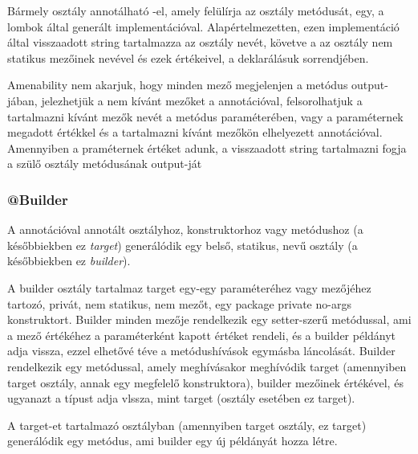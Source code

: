 Bármely osztály annotálható -el, amely felülírja az osztály  metódusát, egy, a lombok által generált implementációval. Alapértelmezetten, ezen implementáció által visszaadott string tartalmazza az osztály nevét, követve a az osztály nem statikus mezőinek nevével és ezek értékeivel, a deklarálásuk sorrendjében. \par

 Amenability nem akarjuk, hogy minden mező megjelenjen a metódus output-jában, jelezhetjük a nem kívánt mezőket a  annotációval, felsorolhatjuk a tartalmazni kívánt mezők nevét a  metódus  paraméterében, vagy a  paraméternek megadott  értékkel és a tartalmazni kívánt mezőkön elhelyezett  annotációval. Amennyiben a  praméternek  értéket adunk, a visszaadott string tartalmazni fogja a szülő osztály  metódusának output-ját \par

\subsubsection{@Builder}

A  annotációval annotált  osztályhoz, konstruktorhoz vagy metódushoz (a későbbiekben ez \emph{target}) generálódik egy belső, statikus,  nevű osztály (a későbbiekben ez \emph{builder}). \par

A builder osztály tartalmaz target egy-egy paraméteréhez vagy mezőjéhez tartozó, privát, nem statikus, nem  mezőt, egy package private no-args konstruktort. Builder minden mezője rendelkezik egy setter-szerű metódussal, ami a mező értékéhez a paraméterként kapott értéket rendeli, és a builder példányt adja vissza, ezzel elhetővé téve a metódushívások egymásba láncolását. Builder rendelkezik egy  metódussal, amely meghívásakor meghívódik target (amennyiben target osztály, annak egy megfelelő konstruktora), builder mezőinek értékével, és ugyanazt a típust adja vlssza, mint target (osztály esetében ez target). \par

A target-et tartalmazó osztályban (amennyiben target osztály, ez target)  generálódik egy  metódus, ami builder egy új példányát hozza létre. \par


